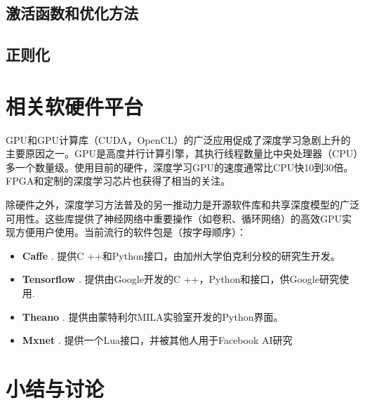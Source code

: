 \subsection{激活函数和优化方法}

\subsection{正则化}

\section{相关软硬件平台}
GPU和GPU计算库（CUDA，OpenCL）的广泛应用促成了深度学习急剧上升的主要原因之一。GPU是高度并行计算引擎，其执行线程数量比中央处理器（CPU）多一个数量级。使用目前的硬件，深度学习GPU的速度通常比CPU快10到30倍。FPGA和定制的深度学习芯片也获得了相当的关注。

除硬件之外，深度学习方法普及的另一推动力是开源软件库和共享深度模型的广泛可用性。这些库提供了神经网络中重要操作（如卷积、循环网络）的高效GPU实现方便用户使用。当前流行的软件包是（按字母顺序）：
\begin{itemize}
 \item {\bf Caffe} \citep{Jia2014}. 提供C ++和Python接口，由加州大学伯克利分校的研究生开发。
 \item {\bf Tensorflow} \citep{Abadi2016TensorFlow}. 提供由Google开发的C ++，Python和接口，供Google研究使用.
 \item {\bf Theano} \citep{AlRfou2016Theano}. 提供由蒙特利尔MILA实验室开发的Python界面。
 \item {\bf Mxnet} \citep{Chen2015mxnet}. 提供一个Lua接口，并被其他人用于Facebook AI研究 
\end{itemize}
 
\section{小结与讨论}

 